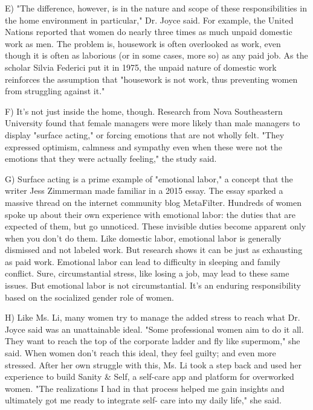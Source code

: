 \documentclass[UTF8,11pt]{ctexart}
\begin{document}
E) "The difference, however, is in the nature and scope of these responsibilities in the home environment in particular," Dr. Joyce said. For example, the United Nations reported that women do nearly three times as much unpaid domestic work as men. The problem is, housework is often overlooked as work, even though it is often as laborious (or in some cases, more so) as any paid job. As the scholar Silvia Federici put it in 1975, the unpaid nature of domestic work reinforces the assumption that "housework is not work, thus preventing women from struggling against it."


F) It's not just inside the home, though. Research from Nova Southeastern University found that female managers were more likely than male managers to display "surface acting," or forcing emotions that are not wholly felt. "They expressed optimism, calmness and sympathy even when these were not the emotions that they were actually feeling," the study said.


G) Surface acting is a prime example of "emotional labor," a concept that the writer Jess Zimmerman made familiar in a 2015 essay. The essay sparked a massive thread on the internet community blog MetaFilter. Hundreds of women spoke up about their own experience with emotional labor: the duties that are expected of them, but go unnoticed. These invisible duties become apparent only when you don't do them. Like domestic labor, emotional labor is generally dismissed and not labeled work. But research shows it can be just as exhausting as paid work. Emotional labor can lead to difficulty in sleeping and family conflict. Sure, circumstantial stress, like losing a job, may lead to these same issues. But emotional labor is not circumstantial. It's an enduring responsibility based on the socialized gender role of women.


H) Like Ms. Li, many women try to manage the added stress to reach what Dr. Joyce said was an unattainable ideal. "Some professional women aim to do it all. They want to reach the top of the corporate ladder and fly like supermom," she said. When women don't reach this ideal, they feel guilty; and even more stressed. After her own struggle with this, Ms. Li took a step back and used her experience to build Sanity \& Self, a self-care app and platform for overworked women. "The realizations I had in that process helped me gain insights and ultimately got me ready to integrate self- care into my daily life," she said.
\end{document}
